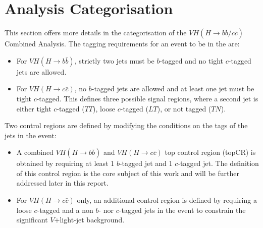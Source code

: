 \section{Analysis Categorisation}\label{ap-vhCat}
This section offers more details in the categorisation of the $VH(H\rightarrow b\bar{b}/c\bar{c})$ Combined Analysis. The tagging requirements for an event to be in the  are:
\begin{itemize}
\item For $VH(H\rightarrow b\bar{b})$, strictly two jets must be $b$-tagged and no tight $c$-tagged jets are allowed. 
\item For $VH(H\rightarrow c\bar{c})$, no $b$-tagged jets are allowed and at least one jet must be tight $c$-tagged. This defines three possible signal regions, where a second jet is either tight $c$-tagged ($TT$), loose $c$-tagged ($LT$), or not tagged ($TN$). 
\end{itemize}
Two control regions are defined by modifying the conditions on the tags of the jets in the event: 
\begin{itemize}
\item A combined $VH(H\rightarrow b\bar{b})$ and $VH(H\rightarrow c\bar{c})$ top control region (topCR) is obtained by requiring at least 1 $b$-tagged jet and 1 $c$-tagged jet. The definition of this control region is the core subject of this work and will be further addressed later in this report. 
\item For $VH(H\rightarrow c\bar{c})$ only, an additional control region is defined by requiring a loose $c$-tagged and a non $b$- nor $c$-tagged jets in the event to constrain the significant $V$+light-jet background. 
\end{itemize}

